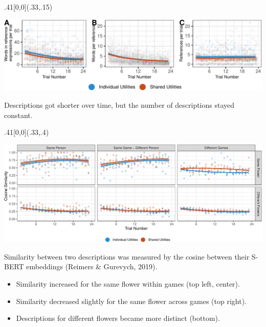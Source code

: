 \documentclass[10pt, xcolor=table, dvipsnames]{beamer}
\begin{document}
	
	\begin{textblock}{.41}[0,0](.33,.15)
	\begin{tcolorbox}[title={\centering Referring expressions reduced over time}]  
		\vspace{.5em}
		\centering
		\includegraphics[width=.9\textwidth]{wordcount-1.pdf}    
		
	\begin{small}	Descriptions got shorter over time, but the number of descriptions stayed constant.   \end{small}                                              
	\end{tcolorbox}
\end{textblock}

	
		\begin{textblock}{.41}[0,0](.33,.4)

		\begin{tcolorbox}[title={\centering Referring expressions converged within groups}]  
			\vspace{.5em}
			\centering
			\includegraphics[width=.9\textwidth]{during-1.pdf}                            			                                                  
			\begin{small}
				
				
					Similarity between two descriptions was measured by the cosine between their S-BERT embeddings (Reimers \& Gurevych, 2019).
				\begin{itemize}

				\item Similarity increased for the same flower within games (top left, center). 
				
				\item Similarity decreased slightly for the same flower across games (top right). 
				
				\item Descriptions for different flowers became more distinct (bottom).
				\end{itemize}
			\end{small}
		\vspace{.5em}
		\end{tcolorbox}
	\end{textblock}
\end{document}
